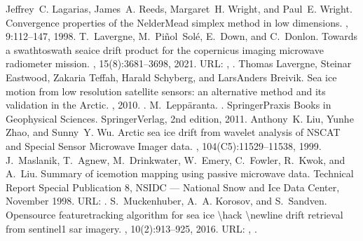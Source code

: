 \documentclass[letterpaper,10pt,english]{jupyterBook}
\begin{document}
\begin{sphinxthebibliography}{10}
\sphinxAtStartPar
Jeffrey C. Lagarias, James A. Reeds, Margaret H. Wright, and Paul E. Wright. Convergence properties of the Nelder\sphinxhyphen{}Mead simplex method in low dimensions. , 9:112–147, 1998.
\sphinxAtStartPar
T. Lavergne, M. Piñol Solé, E. Down, and C. Donlon. Towards a swath\sphinxhyphen{}to\sphinxhyphen{}swath sea\sphinxhyphen{}ice drift product for the copernicus imaging microwave radiometer mission. , 15(8):3681–3698, 2021. URL: , .
\sphinxAtStartPar
Thomas Lavergne, Steinar Eastwood, Zakaria Teffah, Harald Schyberg, and Lars\sphinxhyphen{}Anders Breivik. Sea ice motion from low resolution satellite sensors: an alternative method and its validation in the Arctic. , 2010. .
\sphinxAtStartPar
M. Leppäranta. . Springer\sphinxhyphen{}Praxis Books in Geophysical Sciences. Springer\sphinxhyphen{}Verlag, 2nd edition, 2011.
\sphinxAtStartPar
Anthony K. Liu, Yunhe Zhao, and Sunny Y. Wu. Arctic sea ice drift from wavelet analysis of NSCAT and Special Sensor Microwave Imager data. , 104(C5):11529–11538, 1999.
\sphinxAtStartPar
J. Maslanik, T. Agnew, M. Drinkwater, W. Emery, C. Fowler, R. Kwok, and A. Liu. Summary of ice\sphinxhyphen{}motion mapping using passive microwave data. Technical Report Special Publication 8, NSIDC — National Snow and Ice Data Center, November 1998. URL: .
\sphinxAtStartPar
S. Muckenhuber, A. A. Korosov, and S. Sandven. Open\sphinxhyphen{}source feature\sphinxhyphen{}tracking algorithm for sea ice \textbackslash{}hack \textbackslash{}newline  drift retrieval from sentinel\sphinxhyphen{}1 sar imagery. , 10(2):913–925, 2016. URL: , .

\end{sphinxthebibliography}
\end{document}
